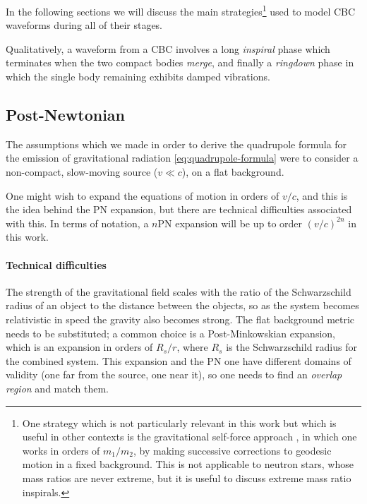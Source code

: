 \documentclass[main.tex]{subfiles}
\begin{document}
In the following sections we will discuss the main strategies\footnote{One strategy which is not particularly relevant in this work but which is useful in other contexts is the gravitational self-force approach \cite{waldIntroductionGravitationalSelfForce2009}, in which one works in orders of \(m_1 / m_2\), by making successive corrections to geodesic motion in a fixed background. This is not applicable to neutron stars, whose mass ratios are never extreme, but it is useful to discuss extreme mass ratio inspirals.} used to model \ac{CBC} waveforms during all of their stages. 

Qualitatively, a waveform from a \ac{CBC} involves a long \emph{inspiral} phase which terminates when the two compact bodies \emph{merge}, and finally a \emph{ringdown} phase in which the single body remaining exhibits damped vibrations.

\subsection{Post-Newtonian} \label{sec:post-newtonian}

The assumptions which we made in order to derive the quadrupole formula for the emission of gravitational radiation \eqref{eq:quadrupole-formula} were to consider a non-compact, slow-moving source (\(v \ll c\)), on a flat background. 

One might wish to expand the equations of motion in orders of \(v / c\), and this is the idea behind the \ac{PN} expansion, but there are technical difficulties associated with this. 
In terms of notation, a \(n\)PN expansion will be up to order \((v/c)^{2n}\) in this work.

\paragraph{Technical difficulties}

The strength of the gravitational field scales with the ratio of the Schwarzschild radius of an object to the distance between the objects, so as the system becomes relativistic in speed the gravity also becomes strong. 
The flat background metric needs to be substituted; a common choice is a Post-Minkowskian expansion, which is an expansion in orders of \(R_s / r\), where \(R_s\) is the Schwarzschild radius for the combined system. 
This expansion and the \ac{PN} one have different domains of validity (one far from the source, one near it), so one needs to find an \emph{overlap region} and match them.  
\end{document}
